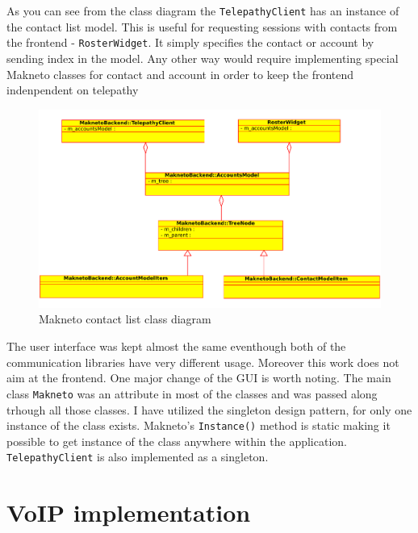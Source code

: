 As you can see from the class diagram the \verb|TelepathyClient| has an instance of the contact list model. This is useful for requesting sessions with contacts from the frontend - \verb|RosterWidget|. It simply specifies the contact or account by sending index in the model. Any other way would require implementing special Makneto classes for contact and account in order to keep the frontend indenpendent on telepathy   

\begin{figure}[ht]
	\begin{center}
	\includegraphics[width=15cm]{fig/contact-list-class-diag.pdf}
	\caption{Makneto contact list class diagram}
	\label{fig:contactListClassDiag}
\end{center}
\end{figure}

The user interface was kept almost the same eventhough both of the communication libraries have very different usage. Moreover this work does not aim at the frontend. One major change of the GUI is worth noting. The main class \verb|Makneto| was an attribute in most of the classes and was passed along trhough all those classes. I have utilized the singleton design pattern, for only one instance of the class exists. Makneto's \verb|Instance()| method is static making it possible to get instance of the class  anywhere within the application. \verb|TelepathyClient| is also implemented as a singleton. 


\chapter{VoIP implementation}\label{chapter:voip-implementation}

